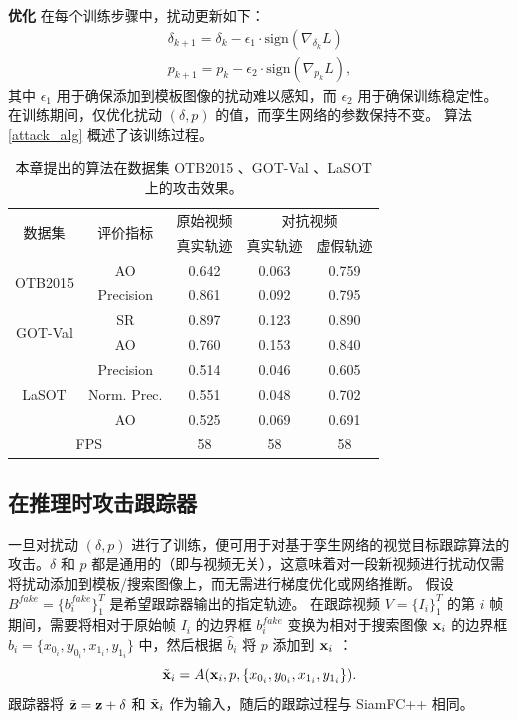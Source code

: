 \textbf{优化} 在每个训练步骤中，扰动更新如下：
\begin{gather}
\delta_{k+1} = \delta_{k} - \epsilon_1 \cdot \text{sign}(\nabla_{\delta_k}L)\\
p_{k+1} = p_{k} - \epsilon_2 \cdot \text{sign}(\nabla_{p_k}L),
\end{gather}
其中 $\epsilon_1$ 用于确保添加到模板图像的扰动难以感知，而 $\epsilon_2$ 用于确保训练稳定性。
在训练期间，仅优化扰动 $(\delta, p)$ 的值，而孪生网络的参数保持不变。
算法 \ref{attack_alg} 概述了该训练过程。

\begin{table}[t]
\centering
\caption{本章提出的算法在数据集 OTB2015 \cite{OTB2015}、GOT-Val \cite{GOT-10k}、LaSOT \cite{LaSOT} 上的攻击效果。}
\begin{tabular}{c c c c c}
\toprule
\multirow{2}{*}[-2pt]{数据集} & \multirow{2}{*}[-2pt]{评价指标} & 原始视频 & \multicolumn{2}{c}{对抗视频}  \\
\cmidrule(lr){3-3} \cmidrule(lr){4-5}
                          &                         & 真实轨迹 & 真实轨迹 & 虚假轨迹     \\ 
\midrule
\multirow{2}{*}{OTB2015 \cite{OTB2015}} 
& AO        & 0.642 & 0.063 & 0.759\\
& Precision & 0.861 & 0.092 & 0.795\\
\midrule
\multirow{2}{*}{GOT-Val \cite{GOT-10k}} 
& SR & 0.897 & 0.123 & 0.890\\
& AO & 0.760 & 0.153 & 0.840 \\
\midrule
\multirow{3}{*}{LaSOT \cite{LaSOT}} 
& Precision   & 0.514 & 0.046 & 0.605\\
& Norm. Prec. & 0.551 & 0.048 & 0.702\\
& AO          & 0.525 & 0.069 & 0.691\\
\midrule
\multicolumn{2}{c}{FPS} & 58 & 58 & 58\\
\bottomrule
\end{tabular}
\label{tab:attack_benchmark results}
\end{table}

\subsection{在推理时攻击跟踪器}

一旦对扰动 $(\delta, p)$ 进行了训练，便可用于对基于孪生网络的视觉目标跟踪算法的攻击。$\delta$ 和 $p$ 都是通用的（即与视频无关），这意味着对一段新视频进行扰动仅需将扰动添加到模板/搜索图像上，而无需进行梯度优化或网络推断。
假设 $B^{fake}=\{b^{fake}_i\}_1^{T}$ 是希望跟踪器输出的指定轨迹。
在跟踪视频 $V=\{I_i\}_1^T$ 的第 $i$ 帧期间，需要将相对于原始帧 $I_i$ 的边界框 $b^{fake}_i$ 变换为相对于搜索图像 $\textbf x_i$ 的边界框 $\hat b_i=\{x_{0_i}, y_{0_i}, x_{1_i}, y_{1_i}\}$ 中，然后根据 $\hat b_i$ 将 $p$ 添加到 $\textbf x_i$ ：
\begin{equation}
\tilde{\textbf x}_i = A(\textbf x_i, p, \{x_{0_i}, y_{0_i}, x_{1_i}, y_{1_i}\}).
\end{equation}
跟踪器将 $\tilde{\textbf z}=\textbf z+\delta$ 和 $\tilde{\textbf x}_i$ 作为输入，随后的跟踪过程与 SiamFC++ 相同。

